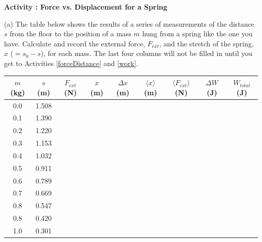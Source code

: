 \textbf{Activity  : Force vs. Displacement for a Spring }

(a) The table below shows the results of a series of measurements of the distance $s$ from the floor to
the position of a mass $m$ hung from a spring like the one you have.
Calculate and record the external force, \( F_{ext} \), 
and the stretch of the spring, \(x\) (\(= s_{0} - s\)), for each mass.
The last four columns will not be filled in until you get to Activities \ref{forceDistance} and \ref{work}.

\begin{center}
\begin{tabular}{|c|c|c|c|c|c|c|c|c|} \hline
$m$ (kg) & $s$ (m) & $ F_{ext} $ (N)  & $x$ (m) & $\Delta x$ (m) & $\langle x\rangle$ (m) & $\langle F_{ext}\rangle $ (N) & $\Delta W$ (J) & $ W_{total}$ (J) \\ \hline
0.0      &  1.508  &                 &         &                &                        &                               &                &                  \\ \hline
0.1      &  1.390  &                 &         &                &                        &                               &                &                  \\ \hline
0.2      &  1.220  &                 &         &                &                        &                               &                &                  \\ \hline
0.3      &  1.153  &                 &         &                &                        &                               &                &                  \\ \hline
0.4      &  1.032  &                 &         &                &                        &                               &                &                  \\ \hline
0.5      &  0.911  &                 &         &                &                        &                               &                &                  \\ \hline
0.6      &  0.789  &                 &         &                &                        &                               &                &                  \\ \hline
0.7      &  0.669  &                 &         &                &                        &                               &                &                  \\ \hline
0.8      &  0.547  &                 &         &                &                        &                               &                &                  \\ \hline
0.8      &  0.420  &                 &         &                &                        &                               &                &                  \\ \hline
1.0      &  0.301  &                 &         &                &                        &                               &                &                  \\ \hline
\end{tabular}
\end{center}

